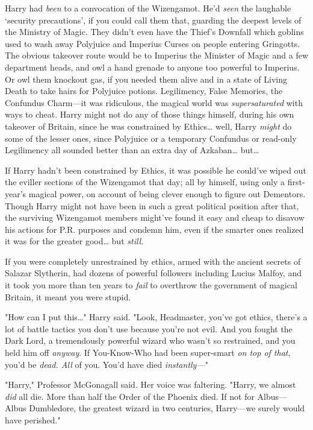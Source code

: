 Harry had \emph{been} to a convocation of the Wizengamot. He'd \emph{seen} the 
laughable `security precautions', if you could call them that, guarding the 
deepest levels of the Ministry of Magic. They didn't even have the Thief's 
Downfall which goblins used to wash away Polyjuice and Imperius Curses on 
people entering Gringotts. The obvious takeover route would be to Imperius the 
Minister of Magic and a few department heads, and owl a hand grenade to anyone 
too powerful to Imperius. Or owl them knockout gas, if you needed them alive 
and in a state of Living Death to take hairs for Polyjuice potions. 
Legilimency, False Memories, the Confundus Charm---it was ridiculous, the 
magical world was \emph{supersaturated} with ways to cheat. Harry might not do 
any of those things himself, during his own takeover of Britain, since he was 
constrained by Ethics{\ldots} well, Harry \emph{might} do some of the lesser 
ones, since Polyjuice or a temporary Confundus or read-only Legilimency all 
sounded better than an extra day of Azkaban{\ldots} but{\ldots}

If Harry hadn't been constrained by Ethics, it was possible he could've wiped 
out the eviller sections of the Wizengamot that day; all by himself, using only 
a first-year's magical power, on account of being clever enough to figure out 
Dementors. Though Harry might not have been in such a great political position 
after that, the surviving Wizengamot members might've found it easy and cheap 
to disavow his actions for P.R. purposes and condemn him, even if the smarter 
ones realized it was for the greater good{\ldots} but \emph{still.}

If you were completely unrestrained by ethics, armed with the ancient secrets 
of Salazar Slytherin, had dozens of powerful followers including Lucius Malfoy, 
and it took you more than ten years to \emph{fail} to overthrow the government 
of magical Britain, it meant you were stupid.

"How can I put this{\ldots}" Harry said. "Look, Headmaster, you've got ethics, 
there's a lot of battle tactics you don't use because you're not evil. And you 
fought the Dark Lord, a tremendously powerful wizard who wasn't so restrained, 
and you held him off \emph{anyway}. If You-Know-Who had been super-smart 
\emph{on top of that}, you'd be \emph{dead. All} of you. You'd have died 
\emph{instantly---}"

"Harry," Professor McGonagall said. Her voice was faltering. "Harry, we almost 
\emph{did} all die. More than half the Order of the Phoenix died. If not for 
Albus---Albus Dumbledore, the greatest wizard in two centuries, Harry---we 
surely would have perished."

